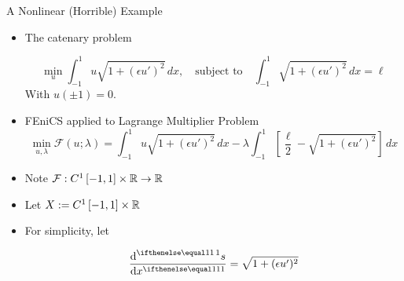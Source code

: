 \documentclass[serif]{beamer}
\begin{document}
\begin{frame}{A Nonlinear (Horrible) Example}
    \begin{itemize}
        \item The catenary problem
        
        \begin{equation}
            \min_u \int_{-1}^1 u \sqrt{1 + \left(\epsilon u'\right)^2} \, dx, \quad 
            \text{subject to} \quad 
            \int_{-1}^1 \sqrt{1 + \left(\epsilon u'\right)^2} \, dx = \ell
        \end{equation}
        With $u(\pm 1) = 0$.
        
        \item FEniCS applied to Lagrange Multiplier Problem
        \begin{equation}
            \min_{u, \lambda} \mathcal{F}(u; \lambda) = 
            \int_{-1}^1 u \sqrt{1 + \left(\epsilon u'\right)^2} \, dx - 
            \lambda \int_{-1}^1 \left[\frac{\ell}{2} - \sqrt{1 + \left(\epsilon u'\right)^2}\right] \, dx
        \end{equation}
        
        \item Note $\mathcal F : C^1\left[-1, 1\right] \times \mathbb{R} \to \mathbb{R}$
        
        \item Let $X := C^1\left[-1, 1\right] \times \mathbb{R}$
        
        \item For simplicity, let 
        
        \[
            \der{s}{x} = \sqrt{1 + (\epsilon u')^2}
        \]
    \end{itemize}
\end{frame}
\end{document}
